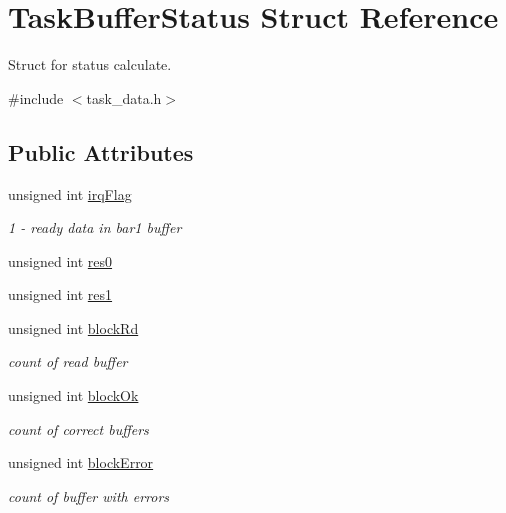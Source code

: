 \hypertarget{structTaskBufferStatus}{
\section{TaskBufferStatus Struct Reference}
\label{structTaskBufferStatus}
}


Struct for status calculate.  


{\ttfamily \#include $<$task\_\-data.h$>$}\subsection*{Public Attributes}
\begin{DoxyCompactItemize}
\item 
unsigned int \hyperlink{structTaskBufferStatus_ad2f11a4542658ad3fdec4eac2bcf8eeb}{irqFlag}
\begin{DoxyCompactList}\small\item\em 1 -\/ ready data in bar1 buffer \item\end{DoxyCompactList}\item 
unsigned int \hyperlink{structTaskBufferStatus_aac53804036a15457af35c1a4fa0595d2}{res0}
\item 
unsigned int \hyperlink{structTaskBufferStatus_a488df55e08dfb02be4d793186efef2f0}{res1}
\item 
unsigned int \hyperlink{structTaskBufferStatus_aa37878c4c19f5cfd5bbb010c3377bd94}{blockRd}
\begin{DoxyCompactList}\small\item\em count of read buffer \item\end{DoxyCompactList}\item 
unsigned int \hyperlink{structTaskBufferStatus_aabc9f698de646935e330356dab0736c9}{blockOk}
\begin{DoxyCompactList}\small\item\em count of correct buffers \item\end{DoxyCompactList}\item 
unsigned int \hyperlink{structTaskBufferStatus_a81844ea492b32a7e9d29dda117a3f935}{blockError}
\begin{DoxyCompactList}\small\item\em count of buffer with errors \item\end{DoxyCompactList}\item 

\end{DoxyCompactItemize}
